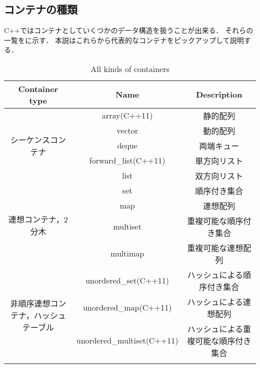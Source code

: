 \subsection{コンテナの種類}
C++ではコンテナとしていくつかのデータ構造を扱うことが出来る．
それらの一覧をに示す．
本説はこれらから代表的なコンテナをピックアップして説明する．
\begin{table}[]
    \begin{center}
    \label{tb:container_type}
    \caption{All kinds of containers}
    \begin{tabular}{c|cc}
    \hline
    Container type & Name & Description \\ \hline \hline
    \multirow{5}{*}{シーケンスコンテナ}          & array(C++11)               & 静的配列                       \\ \cline{2-3}
                                        & vector              & 動的配列                       \\ \cline{2-3}
                                        & deque               & 両端キュー                      \\ \cline{2-3}
                                        & forward\_list(C++11)       & 単方向リスト                     \\ \cline{2-3}
                                        & list                & 双方向リスト                     \\ \hline
    \multirow{4}{*}{連想コンテナ，2分木}         & set                 & 順序付き集合                     \\ \cline{2-3}
                                        & map                 & 連想配列                       \\ \cline{2-3}
                                        & multiset            & 重複可能な順序付き集合                \\ \cline{2-3}
                                        & multimap            & 重複可能な連想配列                  \\ \hline
    \multirow{4}{*}{非順序連想コンテナ，ハッシュテーブル} & unordered\_set(C++11)      & ハッシュによる順序付き集合              \\ \cline{2-3}
                                        & unordered\_map(C++11)      & ハッシュによる連想配列                \\ \cline{2-3}
                                        & unordered\_multiset(C++11) & ハッシュによる重複可能な順序付き集合         \\ \cline{2-3}

\end{tabular}
\end{center}
\end{table}

